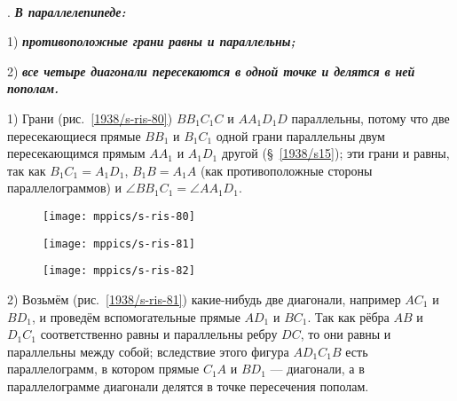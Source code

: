 \paragraph{}\label{1938/s72}
\mbox{.}
\textbf{\emph{В параллелепипеде:}}

1) \textbf{\emph{противоположные грани равны и параллельны;}}

2) \textbf{\emph{все четыре диагонали пересекаются в одной точке и делятся в ней пополам.}}

1) Грани (рис.~\ref{1938/s-ris-80}) $BB_1C_1C$ и $AA_1D_1D$ параллельны, потому что две пересекающиеся прямые $BB_1$ и $B_1C_1$ одной грани параллельны двум пересекающимся прямым $AA_1$ и $A_1D_1$ другой (§~\ref{1938/s15});
эти грани и равны, так как $B_1C_1=A_1D_1$, $B_1B=A_1A$ (как противоположные стороны параллелограммов) и $\angle BB_1C_1=\angle AA_1D_1$.

\begin{figure}[h]
\begin{minipage}{.32\textwidth}
\centering
\texttt{[image: mppics/s-ris-80]}
\end{minipage}\hfill
\begin{minipage}{.32\textwidth}
\centering
\texttt{[image: mppics/s-ris-81]}
\end{minipage}\hfill
\begin{minipage}{.32\textwidth}
\centering
\texttt{[image: mppics/s-ris-82]}
\end{minipage}

\medskip

\begin{minipage}{.32\textwidth}
\centering
\caption{}\label{1938/s-ris-80}
\end{minipage}\hfill
\begin{minipage}{.32\textwidth}
\centering
\caption{}\label{1938/s-ris-81}
\end{minipage}\hfill
\begin{minipage}{.32\textwidth}
\centering
\caption{}\label{1938/s-ris-82}
\end{minipage}
\vskip-4mm
\end{figure} 

2) Возьмём (рис.~\ref{1938/s-ris-81}) какие-нибудь две диагонали, например $AC_1$ и $BD_1$, и проведём вспомогательные прямые $AD_1$ и $BC_1$.
Так как рёбра $AB$ и $D_1C_1$ соответственно равны и параллельны ребру $DC$, то они равны и параллельны между собой;
вследствие этого фигура $AD_1C_1B$ есть параллелограмм, в котором прямые $C_1A$ и $BD_1$ — диагонали, а в параллелограмме диагонали делятся в точке пересечения пополам.

